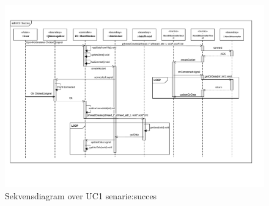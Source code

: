 \begin{figure}[H]
\centering
\includegraphics[width=\textwidth* 1,height=\textwidth* 1 ]{../fig/diagrammer/pc/sd_uc1_succes.pdf}
\caption{Sekvensdiagram over UC1 senarie:succes}
\label{fig:cd_uc1_succes_gui}
\end{figure}

